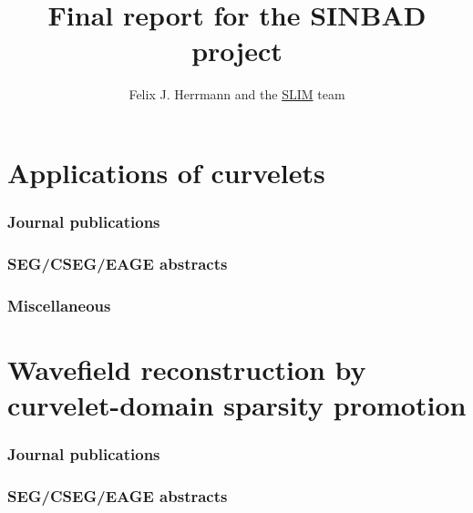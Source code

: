\documentclass{article}
\title{Final report for the SINBAD project}
\author{Felix J. Herrmann and the \href{http://slim.eos.ubc.ca}{SLIM} team}
\begin{document}
\section*{Applications of curvelets}

\subsubsection*{Journal publications}
\label{sec:journal-publications-1}

\noindent
{} 
\noindent
{} 

\subsubsection*{SEG/CSEG/EAGE abstracts}
\label{sec:segcseage-abstracts}

\noindent
{} 
\noindent
{} 
\noindent
{} 
\noindent
{} 
\noindent
{} 
\noindent
{}

\subsubsection*{Miscellaneous}
\label{sec:seg-workshop}
\noindent
{}
\noindent
{}


\section*{Wavefield reconstruction by curvelet-domain sparsity promotion}
\label{sec:wavef-reconstr-curv}
%
\subsubsection*{Journal publications}
\label{sec:journal-publications}

\noindent
{} 

\noindent
{} 

\noindent
{} 

\noindent
{} 

\subsubsection*{SEG/CSEG/EAGE abstracts}
\label{sec:segcs-abstr}
\end{document}
